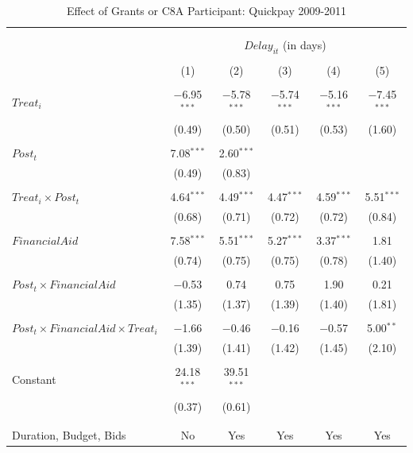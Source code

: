 \documentclass[
]{article}
\begin{document}
\begin{table}[H] \centering 
  \caption{Effect of Grants or C8A Participant: Quickpay 2009-2011} 
  \label{} 
\small 
\begin{tabular}{@{\extracolsep{-2pt}}lccccc} 
\\[-1.8ex]\hline 
\hline \\[-1.8ex] 
\\[-1.8ex] & \multicolumn{5}{c}{$Delay_{it}$ (in days)} \\ 
\\[-1.8ex] & (1) & (2) & (3) & (4) & (5)\\ 
\hline \\[-1.8ex] 
 $Treat_i$ & $-$6.95$^{***}$ & $-$5.78$^{***}$ & $-$5.74$^{***}$ & $-$5.16$^{***}$ & $-$7.45$^{***}$ \\ 
  & (0.49) & (0.50) & (0.51) & (0.53) & (1.60) \\ 
  & & & & & \\ 
 $Post_t$ & 7.08$^{***}$ & 2.60$^{***}$ &  &  &  \\ 
  & (0.49) & (0.83) &  &  &  \\ 
  & & & & & \\ 
 $Treat_i \times Post_t$ & 4.64$^{***}$ & 4.49$^{***}$ & 4.47$^{***}$ & 4.59$^{***}$ & 5.51$^{***}$ \\ 
  & (0.68) & (0.71) & (0.72) & (0.72) & (0.84) \\ 
  & & & & & \\ 
 $FinancialAid$ & 7.58$^{***}$ & 5.51$^{***}$ & 5.27$^{***}$ & 3.37$^{***}$ & 1.81 \\ 
  & (0.74) & (0.75) & (0.75) & (0.78) & (1.40) \\ 
  & & & & & \\ 
 $Post_t \times FinancialAid$ & $-$0.53 & 0.74 & 0.75 & 1.90 & 0.21 \\ 
  & (1.35) & (1.37) & (1.39) & (1.40) & (1.81) \\ 
  & & & & & \\ 
 $Post_t \times FinancialAid \times Treat_i$ & $-$1.66 & $-$0.46 & $-$0.16 & $-$0.57 & 5.00$^{**}$ \\ 
  & (1.39) & (1.41) & (1.42) & (1.45) & (2.10) \\ 
  & & & & & \\ 
 Constant & 24.18$^{***}$ & 39.51$^{***}$ &  &  &  \\ 
  & (0.37) & (0.61) &  &  &  \\ 
  & & & & & \\ 
\hline \\[-1.8ex] 
Duration, Budget, Bids & No & Yes & Yes & Yes & Yes \\ 

\end{tabular}
\end{table}
\end{document}
